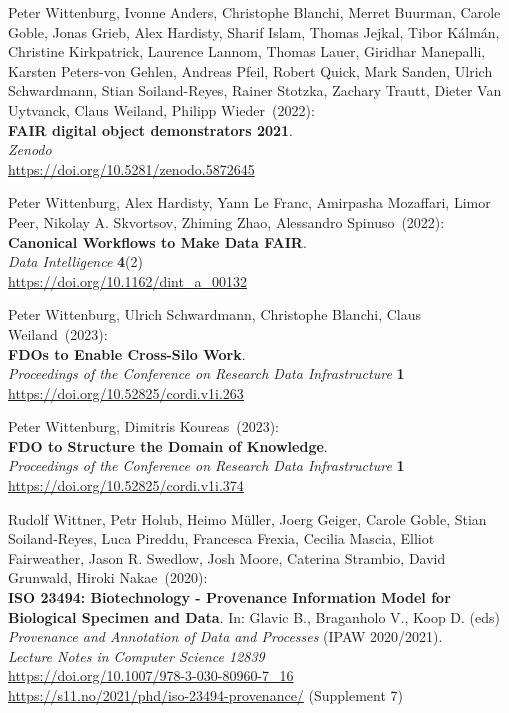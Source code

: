 \begin{thebibliography}{9}
Peter Wittenburg, Ivonne Anders, Christophe Blanchi, Merret Buurman, Carole Goble, Jonas Grieb, Alex Hardisty, Sharif Islam, Thomas Jejkal, Tibor Kálmán, Christine Kirkpatrick, Laurence Lannom, Thomas Lauer, Giridhar Manepalli, Karsten Peters-von Gehlen, Andreas Pfeil, Robert Quick, Mark Sanden, Ulrich Schwardmann, Stian Soiland-Reyes, Rainer Stotzka, Zachary Trautt, Dieter Van Uytvanck, Claus Weiland, Philipp Wieder~(2022): \\
\textbf{FAIR digital object demonstrators 2021}.\\
\emph{Zenodo}\\
\url{https://doi.org/10.5281/zenodo.5872645}

Peter Wittenburg, Alex Hardisty, Yann Le Franc, Amirpasha Mozaffari, Limor Peer, Nikolay A. Skvortsov, Zhiming Zhao, Alessandro Spinuso~(2022): \\
\textbf{Canonical Workflows to Make Data FAIR}.\\
\emph{Data Intelligence} \textbf{4}(2)\\
\url{https://doi.org/10.1162/dint_a_00132}

Peter Wittenburg, Ulrich Schwardmann, Christophe Blanchi, Claus Weiland~(2023): \\
\textbf{FDOs to Enable Cross-Silo Work}.\\
\emph{Proceedings of the Conference on Research Data Infrastructure}
\textbf{1} \\
\url{https://doi.org/10.52825/cordi.v1i.263}

Peter Wittenburg, Dimitris Koureas~(2023): \\
\textbf{FDO to Structure the Domain of Knowledge}.\\
\emph{Proceedings of the Conference on Research Data Infrastructure}
\textbf{1} \\
\url{https://doi.org/10.52825/cordi.v1i.374}

Rudolf Wittner, Petr Holub, Heimo Müller, Joerg Geiger, Carole Goble, Stian Soiland-Reyes, Luca Pireddu, Francesca Frexia, Cecilia Mascia, Elliot Fairweather, Jason R. Swedlow, Josh Moore, Caterina Strambio, David Grunwald, Hiroki Nakae~(2020): \\
\textbf{ISO 23494: Biotechnology - Provenance Information Model for Biological Specimen and Data}.
In: Glavic B., Braganholo V., Koop D. (eds) 
\emph{Provenance and Annotation of Data and Processes} (IPAW 2020/2021).\\
\emph{Lecture Notes in Computer Science 12839}\\
\url{https://doi.org/10.1007/978-3-030-80960-7_16} \\
\url{https://s11.no/2021/phd/iso-23494-provenance/}
(Supplement 7)


\end{thebibliography}
